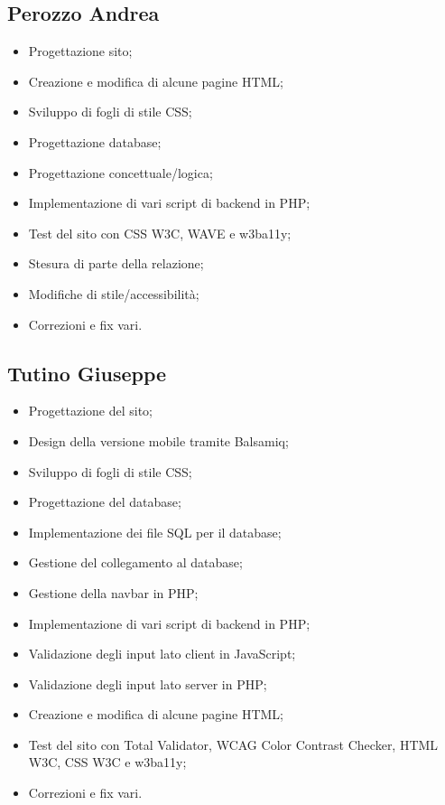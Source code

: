 \documentclass[10pt]{article}
\begin{document}
\subsection{Perozzo Andrea}
\begin{itemize}
    \item Progettazione sito;
    \item Creazione e modifica di alcune pagine HTML;
    \item Sviluppo di fogli di stile CSS;
    \item Progettazione database;
    \item Progettazione concettuale/logica;
    \item Implementazione di vari script di backend in PHP;
    \item Test del sito con CSS W3C, WAVE e w3ba11y;
    \item Stesura di parte della relazione;
    \item Modifiche di stile/accessibilità; 
    \item Correzioni e fix vari.
\end{itemize}
\subsection{Tutino Giuseppe}
\begin{itemize}
    \item Progettazione del sito;
    \item Design della versione mobile tramite Balsamiq;
    \item Sviluppo di fogli di stile CSS;
    \item Progettazione del database;
    \item Implementazione dei file SQL per il database;
    \item Gestione del collegamento al database;
    \item Gestione della navbar in PHP;
    \item Implementazione di vari script di backend in PHP;
    \item Validazione degli input lato client in JavaScript;
    \item Validazione degli input lato server in PHP;
    \item Creazione e modifica di alcune pagine HTML;
    \item Test del sito con Total Validator, WCAG Color Contrast Checker, HTML W3C, CSS W3C e w3ba11y;
    \item Correzioni e fix vari.
\end{itemize}
\end{document}
